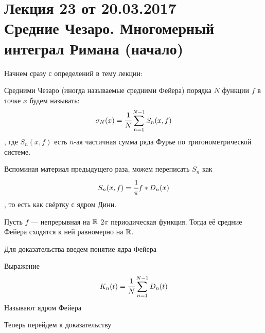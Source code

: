 \pagestyle{fancy}
\section{Лекция 23 от 20.03.2017 \\ Средние Чезаро. Многомерный интеграл Римана (начало)}
	Начнем сразу с определений в тему лекции:
	\begin{Def}
		Средними Чезаро (иногда называемые средними Фейера) порядка $N$ функции $f$ в точке $x$ будем называть:
		$$
			\sigma_N(x) = \cfrac{1}{N} \sum\limits_{n =1}^{N -1}S_n(x,f)
		$$
		, где $S_n(x,f)$ есть $n$-ая частичная сумма ряда Фурье по тригонометрической системе.
	\end{Def}
	Вспоминая материал предыдущего раза, можем переписать $S_n$ как
	$$
		S_n(x,f) = \cfrac{1}{\pi} f*D_n(x)
	$$
	, то есть как свёртку с ядром Дини.
	\begin{Theorem}
		Пусть $f$ --- непрерывная на $\mathbb{R}$ $2\pi$ периодическая функция. Тогда её средние Фейера сходятся к ней равномерно на $\mathbb{R}$. 
	\end{Theorem}
	Для доказательства введем понятие ядра Фейера
	\begin{Def}
		Выражение
		$$
			K_n(t) = \cfrac{1}{N}\sum\limits_{n=1}^{N-1}D_n(t)
		$$
		Называют ядром Фейера
	\end{Def}
	Теперь перейдем к доказательству
